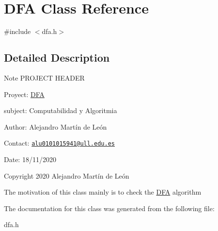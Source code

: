 \hypertarget{classDFA}{}\section{D\+FA Class Reference}
\label{classDFA}


{\ttfamily \#include $<$dfa.\+h$>$}



\subsection{Detailed Description}
\begin{DoxyNote}{Note}
P\+R\+O\+J\+E\+CT H\+E\+A\+D\+ER 

Proyect\+: \hyperlink{classDFA}{D\+FA} 

subject\+: Computabilidad y Algoritmia 

Author\+: Alejandro Martín de León 

Contact\+: \href{mailto:alu0101015941@ull.edu.es}{\tt alu0101015941@ull.\+edu.\+es} 

Date\+: 18/11/2020 

Copyright 2020 Alejandro Martín de León
\end{DoxyNote}
The motivation of this class mainly is to check the \hyperlink{classDFA}{D\+FA} algorithm 

The documentation for this class was generated from the following file\+:\begin{DoxyCompactItemize}
\item 
dfa.\+h\end{DoxyCompactItemize}
